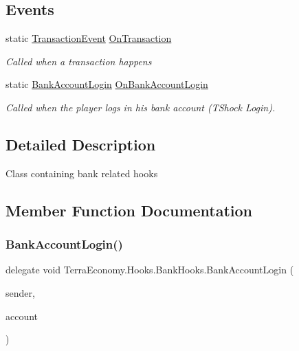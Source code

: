 \subsection*{Events}
\begin{DoxyCompactItemize}
\item 
static \hyperlink{class_terra_economy_1_1_hooks_1_1_bank_hooks_a2474c117fc1cf81a1582effae690e157}{Transaction\+Event} \hyperlink{class_terra_economy_1_1_hooks_1_1_bank_hooks_a4f5eea31bcacba5ee4ae5f1c8eb5af05}{On\+Transaction}
\begin{DoxyCompactList}\small\item\em Called when a transaction happens \end{DoxyCompactList}\item 
static \hyperlink{class_terra_economy_1_1_hooks_1_1_bank_hooks_a4686a5b7f10a6bf6f9e18e9493c7626f}{Bank\+Account\+Login} \hyperlink{class_terra_economy_1_1_hooks_1_1_bank_hooks_a77d0ace226a52bb1587e1a17f0d4a826}{On\+Bank\+Account\+Login}
\begin{DoxyCompactList}\small\item\em Called when the player logs in his bank account (T\+Shock Login). \end{DoxyCompactList}\end{DoxyCompactItemize}


\subsection{Detailed Description}
Class containing bank related hooks 



\subsection{Member Function Documentation}
\mbox{\label{class_terra_economy_1_1_hooks_1_1_bank_hooks_a4686a5b7f10a6bf6f9e18e9493c7626f}} 
\subsubsection{\texorpdfstring{Bank\+Account\+Login()}{BankAccountLogin()}}
{\footnotesize\ttfamily delegate void Terra\+Economy.\+Hooks.\+Bank\+Hooks.\+Bank\+Account\+Login (\begin{DoxyParamCaption}\item[{T\+S\+Player}]{sender,  }\item[{\hyperlink{class_terra_economy_1_1_util_1_1_bank_account}{Bank\+Account}}]{account }\end{DoxyParamCaption})}

